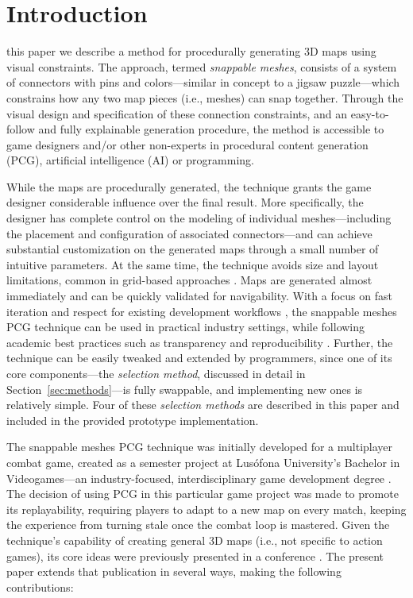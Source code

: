 \documentclass[journal]{IEEEtran}
\begin{document}
\IEEEpeerreviewmaketitle

\section{Introduction}

 this paper we describe a method for procedurally generating 3D maps
using visual constraints. The approach, termed \textit{snappable meshes}, consists of a system
of connectors with pins and colors---similar in concept to a jigsaw puzzle---which constrains
how any two map pieces (i.e., meshes) can snap together. Through the visual design and
specification of these connection constraints, and an easy-to-follow and fully explainable
\cite{zhu2018explainable} generation procedure, the method is accessible to game designers
and/or other non-experts in procedural content generation (PCG), artificial intelligence
(AI) or programming.

While the maps are procedurally generated, the technique grants the game designer considerable
influence over the final result. More specifically, the designer has complete control on the
modeling of individual meshes---including the placement and configuration of associated
connectors---and can achieve substantial customization on the generated maps through a small
number of intuitive parameters. At the same time, the technique avoids size and layout
limitations, common in grid-based approaches \cite{smelik2014survey}. Maps are generated almost
immediately and can be quickly validated for navigability. With a focus on fast iteration and
respect for existing development workflows \cite{lai2020towards}, the snappable meshes PCG
technique can be used in practical industry settings, while following academic
best practices such as transparency and reproducibility \cite{peng2011reproducible}. Further,
the technique can be easily tweaked and extended by programmers, since one of its core
components---the \textit{selection method}, discussed in detail in Section~\ref{sec:methods}---is
fully swappable, and implementing new ones is relatively simple. Four of these \textit{selection
methods} are described in this paper and included in the provided prototype implementation.

The snappable meshes PCG technique was initially developed for a multiplayer combat game,
created as a semester project at Lusófona University's Bachelor in Videogames---an
industry-focused, interdisciplinary game development degree \cite{fachada2020topdown}.
The decision of using PCG in this particular game project was made to promote its replayability,
requiring players to adapt to a new map on every match, keeping the experience from turning stale
once the combat loop is mastered. Given the technique's capability of creating general 3D maps
(i.e., not specific to action games), its core ideas were previously presented in a conference
\cite{esilva2020procedural}. The present paper extends that publication in several ways, making
the following contributions:
\end{document}
